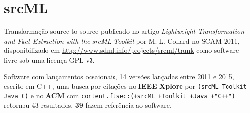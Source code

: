 \section{srcML}

Transformação source-to-source
publicado no artigo {\it Lightweight Transformation and Fact Extraction with the srcML Toolkit}
por M. L. Collard
no SCAM 2011,
disponibilizado em \url{http://www.sdml.info/projects/srcml/trunk}
como software livre
sob uma licença GPL v3.

Software com lançamentos ocsaionais,
14 versões lançadas
entre 2011 e 2015,
escrito em C++,
uma busca por citações no {\bf IEEE Xplore} por
\texttt{(srcML Toolkit Java C)}
e no {\bf ACM} com
\texttt{content.ftsec:(+srcML +Toolkit +Java +"C++")}
retornou
43 resultados,
{\bf 39} fazem referência ao software.

